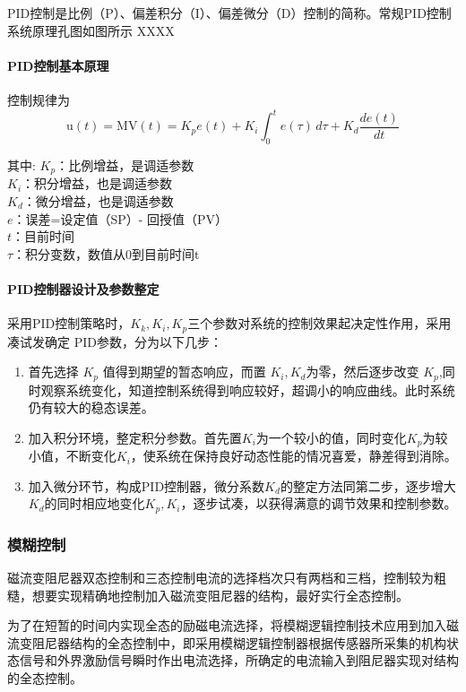 PID控制是比例（P）、偏差积分（I）、偏差微分（D）控制的简称。常规PID控制系统原理孔图如图所示 XXXX


\paragraph{PID控制基本原理}
\qquad 控制规律为
\[\mathrm{u}(t)=\mathrm{MV}(t)=K_p{e(t)} + K_{i}\int_{0}^{t}{e(\tau)}\,{d\tau} + K_{d}\frac{de(t)}{dt}\]

其中:
$K_p$：比例增益，是调适参数\\
$K_i$：积分增益，也是调适参数\\
$K_d$：微分增益，也是调适参数\\
$e$：误差=设定值（SP）- 回授值（PV）\\
$t$：目前时间\\
$\tau$：积分变数，数值从0到目前时间t

\paragraph{PID控制器设计及参数整定}
\qquad 采用PID控制策略时，$K_{k},K_{i},K_{p}$三个参数对系统的控制效果起决定性作用，采用凑试发确定 PID参数，分为以下几步：
\begin{enumerate}
\item 首先选择 $K_p$ 值得到期望的暂态响应，而置 $K_i,K_d$为零，然后逐步改变 $K_p$,同时观察系统变化，知道控制系统得到响应较好，超调小的响应曲线。此时系统仍有较大的稳态误差。
\item 加入积分环境，整定积分参数。首先置$K_i$为一个较小的值，同时变化$K_p$为较小值，不断变化$K_i$，使系统在保持良好动态性能的情况喜爱，静差得到消除。
\item 加入微分环节，构成PID控制器，微分系数$K_d$的整定方法同第二步，逐步增大$K_d$的同时相应地变化$K_p,K_i$，逐步试凑，以获得满意的调节效果和控制参数。
\end{enumerate}



\subsubsection{模糊控制}
磁流变阻尼器双态控制和三态控制电流的选择档次只有两档和三档，控制较为粗糙，想要实现精确地控制加入磁流变阻尼器的结构，最好实行全态控制。

为了在短暂的时间内实现全态的励磁电流选择，将模糊逻辑控制技术应用到加入磁流变阻尼器结构的全态控制中，即采用模糊逻辑控制器根据传感器所采集的机构状态信号和外界激励信号瞬时作出电流选择，所确定的电流输入到阻尼器实现对结构的全态控制。

